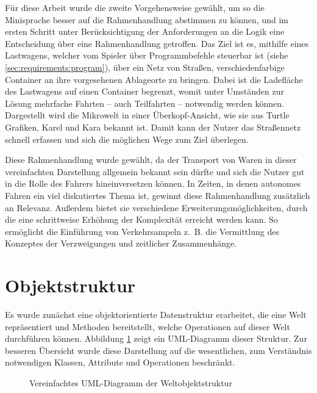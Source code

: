 Für diese Arbeit wurde die zweite Vorgehensweise gewählt, um so die Minisprache besser auf die Rahmenhandlung abstimmen zu können, und im ersten Schritt unter Berücksichtigung der Anforderungen an die Logik eine Entscheidung über eine Rahmenhandlung getroffen. Das Ziel ist es, mithilfe eines Lastwagens, welcher vom Spieler über Programmbefehle steuerbar ist (siehe \ref{sec:requirements:program}), über ein Netz von Straßen, verschiedenfarbige Container an ihre vorgesehenen Ablageorte zu bringen. Dabei ist die Ladefläche des Lastwagens auf einen Container begrenzt, womit unter Umständen zur Lösung mehrfache Fahrten -- auch Teilfahrten -- notwendig werden können. Dargestellt wird die Mikrowelt in einer Überkopf-Ansicht, wie sie aus Turtle Grafiken, Karel und Kara bekannt ist. Damit kann der Nutzer das Straßennetz schnell erfassen und sich die möglichen Wege zum Ziel überlegen.

Diese Rahmenhandlung wurde gewählt, da der Transport von Waren in dieser vereinfachten Darstellung allgemein bekannt sein dürfte und sich die Nutzer gut in die Rolle des Fahrers hineinversetzen können. In Zeiten, in denen autonomes Fahren ein viel diskutiertes Thema ist, gewinnt diese Rahmenhandlung zusätzlich an Relevanz. Außerdem bietet sie verschiedene Erweiterungsmöglichkeiten, durch die eine schrittweise Erhöhung der Komplexität erreicht werden kann. So ermöglicht die Einführung von Verkehrsampeln z.~B. die Vermittlung des Konzeptes der Verzweigungen und zeitlicher Zusammenhänge.

\section{Objektstruktur}
\label{sec:implementation:structure}

Es wurde zunächst eine objektorientierte Datenstruktur erarbeitet, die eine Welt repräsentiert und Methoden bereitstellt, welche Operationen auf dieser Welt durchführen können. Abbildung \ref{fig:implementation:structure:uml} zeigt ein UML-Diagramm dieser Struktur. Zur besseren Übersicht wurde diese Darstellung auf die wesentlichen, zum Verständnis notwendigen Klassen, Attribute und Operationen beschränkt.

\begin{figure}
  
  \caption{Vereinfachtes UML-Diagramm der Weltobjektstruktur}
  \label{fig:implementation:structure:uml}
\end{figure}

